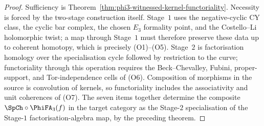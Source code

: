 \begin{proof}
Sufficiency is Theorem~\ref{thm:phi3-witnessed-kernel-functoriality}.
Necessity is forced by the two-stage construction itself. Stage~$1$
uses the negative-cyclic CY class, the cyclic bar complex, the chosen
$E_3$ formality point, and the Costello--Li holomorphic twist; a map
through Stage~$1$ must therefore preserve these data up to coherent
homotopy, which is precisely \textup{(O1)--(O5)}. Stage~$2$ is
factorisation homology over the specialisation cycle followed by
restriction to the curve; functoriality through this operation requires
the Beck--Chevalley, Fubini, proper-support, and Tor-independence cells
of \textup{(O6)}. Composition of morphisms in the source is convolution
of kernels, so functoriality includes the associativity and unit
coherences of \textup{(O7)}. The seven items together determine the
composite $\SpCh\circ\PhiFA_3(f)$ in the target category as the
Stage-$2$ specialisation of the Stage-$1$ factorisation-algebra map,
by the preceding theorem.
\end{proof}

